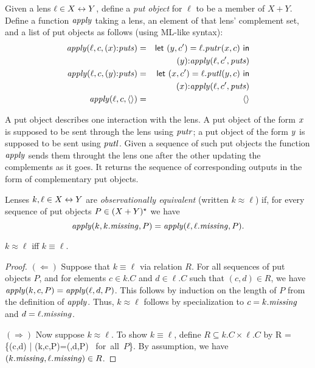 \begin{defn}[$R$-similarity]
\iffull
\begin{defn}
Given a lens $\ell \in X \leftrightarrow Y$, define a \emph{put object} for $\ell$ to
be a member of $X + Y$. Define a function $\mathit{apply}$ taking a lens, an element
of that lens' complement set, and a list of put objects as follows\iftext{}
(using ML-like syntax)\fi:
\begin{eqnarray*}
\mathit{apply}(\ell,c,( x) \mathord{:} \mathit{puts}) &=& \mathsf{let}\  (y,c') = \ell.\mathit{putr}(x,c) \ \mathsf{in} \\
&& ( y) \mathord{:} \mathit{apply}(\ell,c',\mathit{puts}) \\
\mathit{apply}(\ell,c,( y) \mathord{:} \mathit{puts}) &=& \mathsf{let}\  (x,c') = \ell.\mathit{putl}(y,c) \ \mathsf{in} \\
&& ( x) \mathord{:} \mathit{apply}(\ell,c',\mathit{puts}) \\
\mathit{apply}(\ell,c,\left<\right>) &=&  \left<\right>
\end{eqnarray*}
\end{defn}
A put object describes one interaction with the lens. A put object of the form $ x$ is supposed to be sent through the lens using $\mathit{putr}$; a put object of the form $ y$ is supposed to be sent using $\mathit{putl}$. Given a sequence of such put objects the function $\mathit{apply}$ sends them throught the lens one after the other updating the complements as it goes. It returns the sequence of corresponding outputs in the form of complementary put objects. 
\begin{defn}
Lenses $k,\ell \in X \leftrightarrow Y$ are \emph{observationally equivalent} (written
$k \approx \ell$) if, for every sequence of put objects $P \in (X + Y)^\star$
we have
\[\mathit{apply}(k,k.\mathit{missing},P) = \mathit{apply}(\ell,\ell.\mathit{missing},P).\]
\end{defn}

\iffull
\begin{theorem}
\else
\begin{theorem}
\fi
    $k \approx \ell$ iff $k \equiv \ell$.
\end{theorem}

\begin{proof}
$(\Longleftarrow)$ Suppose that $k\equiv \ell$ via relation $R$. For all
sequences of put objects $P$, and for
elements $c \in k.C$ and $d\in \ell.C$ such that $(c,d) \in R$, we have
$\mathit{apply}(k,c,P)=\mathit{apply}(\ell,d,P)$. This follows by induction on the length of $P$
from the definition of $\mathit{apply}$.
Thus, $k\approx \ell$ follows by specialization to $c=k.\mathit{missing}$ and
$d=\ell.\mathit{missing}$. 

$(\Longrightarrow)$ Now suppose $k\approx \ell$. To show $k\equiv \ell$, define $R
\subseteq k.C \times \ell.C$ by
\dissdis
R = \{(c,d) \;|\; \apply(k,c,P)=\apply(\ell,d,P) \mbox{ for all $P$}\}.
\dissdis By assumption, we have $(k.\mathit{missing}, \ell.\mathit{missing}) \in R$.


\end{proof}
\end{theorem}
\end{defn}

